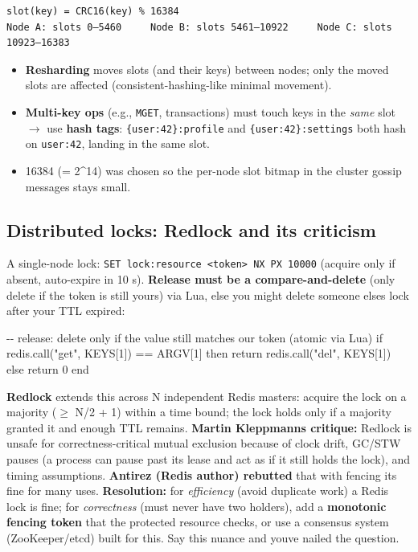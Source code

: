 \documentclass[11pt]{article}
\providecommand{\tightlist}{\setlength{\itemsep}{1pt}\setlength{\parskip}{0pt}}
\newenvironment{Shaded}{\begin{snugshade}}{\end{snugshade}}
\newcommand{\NormalTok}[1]{\textcolor[rgb]{0.81,0.81,0.76}{#1}}
\begin{document}
\setcodelang{}

\begin{verbatim}
slot(key) = CRC16(key) % 16384
Node A: slots 0–5460     Node B: slots 5461–10922     Node C: slots 10923–16383
\end{verbatim}

\begin{itemize}
\tightlist
\item
  \textbf{Resharding} moves slots (and their keys) between nodes; only the moved slots are affected (consistent-hashing-like minimal movement).
\item
  \textbf{Multi-key ops} (e.g., \texttt{MGET}, transactions) must touch keys in the \emph{same} slot \(\rightarrow\) use \textbf{hash tags}: \texttt{\{user:42\}:profile} and \texttt{\{user:42\}:settings} both hash on \texttt{user:42}, landing in the same slot.
\item
  16384 (= 2\^{}14) was chosen so the per-node slot bitmap in the cluster gossip messages stays small.
\end{itemize}

\subsection{Distributed locks: Redlock and its criticism}\label{distributed-locks-redlock-and-its-criticism}

A single-node lock: \texttt{SET\ lock:resource\ \textless{}token\textgreater{}\ NX\ PX\ 10000} (acquire only if absent, auto-expire in 10 s). \textbf{Release must be a compare-and-delete} (only delete if the token is still yours) via Lua, else you might delete someone else\textquotesingle s lock after your TTL expired:


\begin{Shaded}
\begin{Highlighting}[]
\NormalTok{{-}{-} release: delete only if the value still matches our token (atomic via Lua)}
\NormalTok{if redis.call("get", KEYS[1]) == ARGV[1] then}
\NormalTok{    return redis.call("del", KEYS[1])}
\NormalTok{else}
\NormalTok{    return 0}
\NormalTok{end}
\end{Highlighting}
\end{Shaded}

\textbf{Redlock} extends this across N independent Redis masters: acquire the lock on a majority (\(\geq\) N/2 + 1) within a time bound; the lock holds only if a majority granted it and enough TTL remains. \textbf{Martin Kleppmann\textquotesingle s critique:} Redlock is unsafe for correctness-critical mutual exclusion because of clock drift, GC/STW pauses (a process can pause past its lease and act as if it still holds the lock), and timing assumptions. \textbf{Antirez (Redis author) rebutted} that with fencing it\textquotesingle s fine for many uses. \textbf{Resolution:} for \emph{efficiency} (avoid duplicate work) a Redis lock is fine; for \emph{correctness} (must never have two holders), add a \textbf{monotonic fencing token} that the protected resource checks, or use a consensus system (ZooKeeper/etcd) built for this. Say this nuance and you\textquotesingle ve nailed the question.
\end{document}
